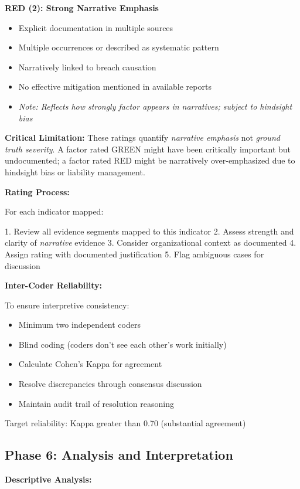 \documentclass[11pt,a4paper]{article}
\begin{document}
\textbf{RED (2): Strong Narrative Emphasis}
\begin{itemize}
\item Explicit documentation in multiple sources
\item Multiple occurrences or described as systematic pattern
\item Narratively linked to breach causation
\item No effective mitigation mentioned in available reports
\item \textit{Note: Reflects how strongly factor appears in narratives; subject to hindsight bias}
\end{itemize}

\textbf{Critical Limitation:} These ratings quantify \textit{narrative emphasis} not \textit{ground truth severity}. A factor rated GREEN might have been critically important but undocumented; a factor rated RED might be narratively over-emphasized due to hindsight bias or liability management.

\textbf{Rating Process:}

For each indicator mapped:

1. Review all evidence segments mapped to this indicator
2. Assess strength and clarity of \textit{narrative} evidence
3. Consider organizational context as documented
4. Assign rating with documented justification
5. Flag ambiguous cases for discussion

\textbf{Inter-Coder Reliability:}

To ensure interpretive consistency:
\begin{itemize}
\item Minimum two independent coders
\item Blind coding (coders don't see each other's work initially)
\item Calculate Cohen's Kappa for agreement
\item Resolve discrepancies through consensus discussion
\item Maintain audit trail of resolution reasoning
\end{itemize}

Target reliability: Kappa greater than 0.70 (substantial agreement)

\subsection{Phase 6: Analysis and Interpretation}

\textbf{Descriptive Analysis:}
\end{document}

